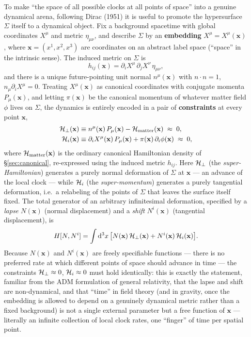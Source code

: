 To make ``the space of all possible clocks at all points of space'' into a
genuine dynamical arena, following Dirac (1951) it is useful to promote the
hypersurface $\Sigma$ itself to a dynamical object. Fix a background spacetime
with global coordinates $X^\mu$ and metric $\eta_{\mu\nu}$, and describe
$\Sigma$ by an \textbf{embedding} $X^\mu=X^\mu(\mathbf{x})$, where
$\mathbf{x}=(x^1,x^2,x^3)$ are coordinates on an abstract label space
(``space'' in the intrinsic sense). The induced metric on $\Sigma$ is
\begin{equation}
h_{ij}(\mathbf{x}) = \partial_iX^\mu\,\partial_jX^\nu\,\eta_{\mu\nu},
\end{equation}
and there is a unique future-pointing unit normal $n^\mu(\mathbf{x})$ with
$n\cdot n=1$, $n_\mu\partial_iX^\mu=0$. Treating $X^\mu(\mathbf{x})$ as
canonical coordinates with conjugate momenta $P_\mu(\mathbf{x})$, and letting
$\pi(\mathbf{x})$ be the canonical momentum of whatever matter field $\phi$
lives on $\Sigma$, the dynamics is entirely encoded in a pair of
\textbf{constraints} at every point $\mathbf{x}$,
\begin{align}
\mathcal{H}_\perp(\mathbf{x}) &\equiv n^\mu(\mathbf{x})\,P_\mu(\mathbf{x}) -
    \mathcal{H}_{\mathrm{matter}}(\mathbf{x}) \;\approx\; 0, \label{eq:superham}\\
\mathcal{H}_i(\mathbf{x}) &\equiv \partial_iX^\mu(\mathbf{x})\,P_\mu(\mathbf{x}) +
    \pi(\mathbf{x})\,\partial_i\phi(\mathbf{x}) \;\approx\; 0, 
    \label{eq:supermomentum}
\end{align}
where $\mathcal{H}_{\mathrm{matter}}(\mathbf{x})$ is the ordinary canonical
Hamiltonian density of \S\ref{sec:canonical}, re-expressed using the induced
metric $h_{ij}$. Here $\mathcal{H}_\perp$ (the \emph{super-Hamiltonian}) generates a
purely normal deformation of $\Sigma$ at $\mathbf{x}$ --- an advance of the
local clock --- while $\mathcal{H}_i$ (the \emph{super-momentum}) generates a purely
tangential deformation, i.e.\ a relabeling of the points of $\Sigma$ that
leaves the surface itself fixed. The total generator of an arbitrary
infinitesimal deformation, specified by a \emph{lapse} $N(\mathbf{x})$ (normal
displacement) and a \emph{shift} $N^i(\mathbf{x})$ (tangential displacement),
is
\begin{equation}
H[N,N^i] = \int \mathrm{d}^3x\, \big[N(\mathbf{x})\,\mathcal{H}_\perp(\mathbf{x}) + N^i(\mathbf{x})\,\mathcal{H}_i(\mathbf{x})\big].
\end{equation}
Because $N(\mathbf{x})$ and $N^i(\mathbf{x})$ are freely specifiable functions
--- there is no preferred rate at which different points of space should
advance in time --- the constraints $\mathcal{H}_\perp\approx0$, $\mathcal{H}_i\approx0$ must
hold identically: this is exactly the statement, familiar from the ADM
formulation of general relativity, that the lapse and shift are non-dynamical,
and that ``time'' in field theory (and in gravity, once the embedding is
allowed to depend on a genuinely dynamical metric rather than a fixed
background) is not a single external parameter but a free function of
$\mathbf{x}$ --- literally an infinite collection of local clock rates, one
``finger'' of time per spatial point.

